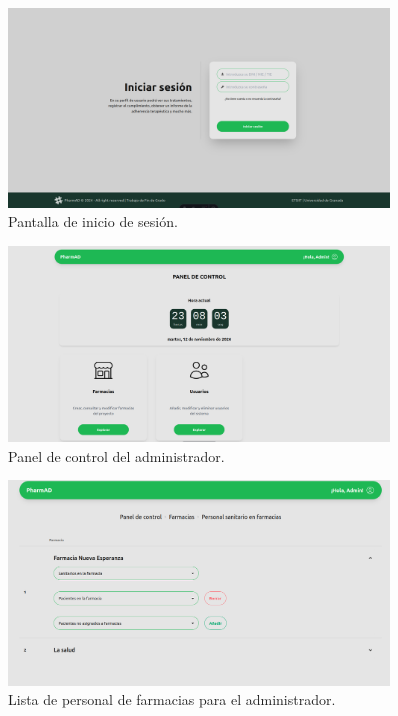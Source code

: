 \begin{figure}[h!]
	\centering
	\includegraphics[width=0.9\textwidth]{imagenes/login.png}
	\caption{Pantalla de inicio de sesión.}
\end{figure}


\begin{figure}[h!]
	\centering
	\includegraphics[width=0.9\textwidth]{imagenes/admin.png}
	\caption{Panel de control del administrador.}
\end{figure}


\begin{figure}[h!]
	\centering
	\includegraphics[width=0.9\textwidth]{imagenes/personalfarmacias.png}
	\caption{Lista de personal de farmacias para el administrador.}
\end{figure}


